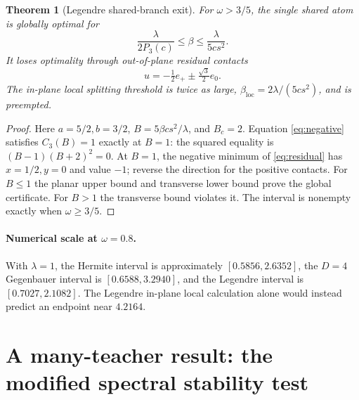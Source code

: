 \documentclass[11pt]{article}
\newcommand{\loc}{\mathrm{loc}}
\newtheorem{theorem}{Theorem}[section]
\theoremstyle{remark}
\begin{document}
\begin{theorem}[Legendre shared-branch exit]\label{thm:legendreexit}
For $\omega>3/5$, the single shared atom is globally optimal for
\begin{equation}\label{eq:legendreexit}
 \boxed{\frac\lambda{2P_3(c)}\leq\beta\leq
        \frac\lambda{5cs^2}.}
\end{equation}
It loses optimality through out-of-plane residual contacts
\begin{equation}
 u=-\tfrac12 e_+\pm\tfrac{\sqrt3}{2}e_0.
\end{equation}
The in-plane local splitting threshold is twice as large,
$\beta_\loc=2\lambda/(5cs^2)$, and is preempted.
\end{theorem}
\begin{proof}
Here $a=5/2,b=3/2$, $B=5\beta cs^2/\lambda$, and $B_c=2$.
Equation \eqref{eq:negative} satisfies $C_3(B)=1$ exactly at $B=1$:
the squared equality is $(B-1)(B+2)^2=0$. At $B=1$, the negative
minimum of \eqref{eq:residual} has $x=1/2,y=0$ and value $-1$;
reverse the direction for the positive contacts. For $B\leq1$ the
planar upper bound and transverse lower bound prove the global certificate.
For $B>1$ the transverse bound violates it. The interval is nonempty
exactly when $\omega\geq3/5$.
\end{proof}

\paragraph{Numerical scale at $\omega=0.8$.}
With $\lambda=1$, the Hermite interval is approximately
$[0.5856,2.6352]$, the $D=4$ Gegenbauer interval is
$[0.6588,3.2940]$, and the Legendre interval is
$[0.7027,2.1082]$. The Legendre in-plane local calculation alone
would instead predict an endpoint near $4.2164$.

\section{A many-teacher result: the modified spectral stability test}
\end{document}
